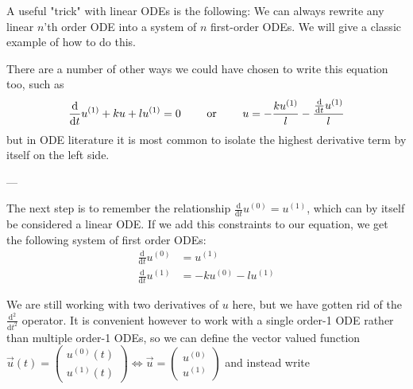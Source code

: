 A useful "trick" with linear ODEs is the following: We can always rewrite any linear $n$'th order ODE into a system of $n$ first-order ODEs. We will give a classic example of how to do this. 

There are a number of other ways we could have chosen to write this equation too, such as $$\frac{\text{d}}{\text{d}t}u^{(1)} + ku + lu^{(1)}= 0 \hspace{20px} \text{ or } \hspace{20px} u = - \frac{ku^{(1)}}{l} - \frac{\frac{\text{d}}{\text{d}t}u^{(1)}}{l}$$ but in ODE literature it is most common to isolate the highest derivative term by itself on the left side. 

---

The next step is to remember the relationship $\frac{\text{d}}{\text{d}t}u^{(0)} = u^{(1)}$, which can by itself be considered a linear ODE. If we add this constraints to our equation, we get the following system of first order ODEs: 
\begin{align*}
\frac{\text{d}}{\text{d}t}u^{(0)} &= u^{(1)}
\\ 
\frac{\text{d}}{\text{d}t}u^{(1)} &= -ku^{(0)} - lu^{(1)}
\end{align*}

We are still working with two derivatives of $u$ here, but we have gotten rid of the $\frac{\text{d}^2}{\text{d}t^2}$ operator. It is convenient however to work with a single order-1 ODE rather than multiple order-1 ODEs, so we can define the vector valued function $\vec{u}(t) =\begin{pmatrix}u^{(0)}(t) \\ u^{(1)}(t)\end{pmatrix} \iff \vec{u} = \begin{pmatrix}u^{(0)} \\ u^{(1)}\end{pmatrix}$ and instead write

